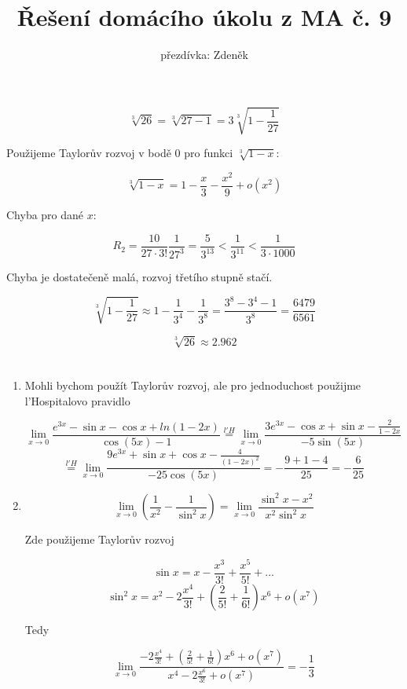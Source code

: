 \documentclass[10pt,a4paper]{article}
\title{Řešení domácího úkolu z MA č. 9}
\author{přezdívka: Zdeněk}
\date{}
\theoremstyle{plain}
\theoremstyle{definition}
\begin{document}
\maketitle

\section{}

\[ \sqrt[3]{26} = \sqrt[3]{27-1} = 3\sqrt[3]{1 - \frac1{27}}\]

Použijeme Taylorův rozvoj v bodě $0$ pro funkci $\sqrt[3]{1-x}$:

\[ \sqrt[3]{1-x} = 1 - \frac{x}3 - \frac{x^2}{9} + o(x^2) \]

Chyba pro dané $x$: 

\[ R_2 = \frac{10}{27 \cdot 3!}\frac{1}{27^3} = \frac{5}{3^13} < \frac{1}{3^{11}} < \frac{1}{3 \cdot 1000}  \]

Chyba je dostatečeně malá, rozvoj třetího stupně stačí.

\[  \sqrt[3]{1-\frac{1}{27}} \approx 1 - \frac1{3^4} - \frac{1}{3^8} = 
 \frac{3^8 - 3^4 - 1}{3^8} = \frac{6479}{6561} \]
 
 \[ \sqrt[3]{26} \approx 2.962  \]

\section{}

\begin{enumerate}[label=|\alph*|]
\item Mohli bychom použít Taylorův rozvoj, ale pro jednoduchost použijme l'Hospitalovo pravidlo


\[ \lim_{x \to 0} \frac{e^{3x} -\sin x - \cos x + ln(1-2x)}{\cos(5x)-1} \overset{l'H}{=}
 \lim_{x \to 0} \frac{3e^{3x} - \cos x + \sin x - \frac{2}{1-2x}}{-5\sin(5x)}\]\[
 \overset{l'H}{=}
 \lim_{x \to 0} \frac{9e^{3x} + \sin x + \cos x - \frac{4}{(1-2x)^2}}{-25 \cos(5x)}  = - \frac{9+1-4}{25} = -\frac{6}{25} \]
 
 \item 
 
 \[ \lim_{x \to 0} \left( \frac{1}{x^2} - \frac{1}{\sin^2 x} \right) 
  = \lim_{x \to 0} \frac{\sin^2x - x^2}{x^2\sin^2x} 
\]

Zde použijeme Taylorův rozvoj

\[ \sin x = x - \frac{x^3}{3!} + \frac{x^5}{5!} + ... \]
\[ \sin^2 x = x^2 - 2\frac{x^4}{3!} + \left( \frac{2}{5!} + \frac{1}{6!} \right)x ^6 + o(x^7) \]

Tedy

\[  \lim_{x \to 0} \frac{- 2\frac{x^4}{3!} + \left( \frac{2}{5!} + \frac{1}{6!} \right)x ^6 + o(x^7)}{ x^4 - 2\frac{x^6}{3!} + o(x^7)  } = - \frac13 \]
\end{enumerate}
\end{document}
